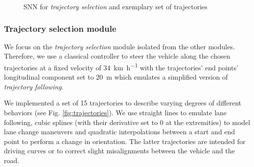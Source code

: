 \begin{figure}[t!]
\centering
{}
\hfill
{}
\caption{\ac{SNN} for \emph{trajectory selection} and exemplary set of trajectories}
\end{figure}

\subsubsection{Trajectory selection module}%
\label{ssubsec:trajectory_selection_module}

We focus on the \emph{trajectory selection} module isolated from the other modules.
Therefore, we use a classical controller to steer the vehicle along the chosen trajectories at a fixed velocity of \SI{34}{\kilo\metre\per\hour} with the trajectories' end points' longitudinal component set to \SI{20}{\metre} which emulates a simplified version of \emph{trajectory following}. \par
We implemented a set of \num{15} trajectories to describe varying degrees of different behaviors (see Fig. \ref{fig:trajectories}).
We use straight lines to emulate lane following, cubic splines (with their derivative set to \num{0} at the extremities) to model lane change maneuvers and quadratic interpolations between a start and end point to perform a change in orientation.
The latter trajectories are intended for driving curves or to correct slight misalignments between the vehicle and the road.

